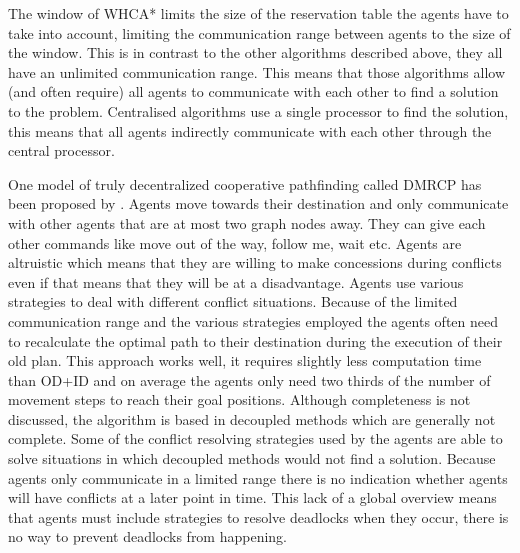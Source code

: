 The window of WHCA* limits the size of the reservation table the agents have to
take into account, limiting the communication range between agents to the size
of the window. This is in contrast to the other algorithms described above,
they all have an unlimited communication range. This means that those
algorithms allow (and often require) all agents to communicate with each other
to find a solution to the problem. Centralised algorithms use a single
processor to find the solution, this means that all agents indirectly
communicate with each other through the central processor.

One model of truly decentralized cooperative pathfinding called DMRCP has been
proposed by \cite{wei2016}. Agents move towards their destination and only
communicate with other agents that are at most two graph nodes away. They can
give each other commands like
move out of the way, follow me, wait etc. Agents are altruistic which means
that they are willing to make concessions during conflicts even if that means
that they will be at a disadvantage. Agents use various strategies to deal with
different conflict situations. Because of the limited communication range and
the various strategies employed the agents often need to recalculate the
optimal path to their destination during the execution of their old plan. This
approach works well, it requires slightly less computation time than OD+ID and
on average the agents only need two thirds of the number of movement steps to
reach their goal positions. Although completeness is not discussed, the
algorithm is based in decoupled methods which are generally not complete. Some
of the conflict resolving strategies used by the agents are able to solve
situations in which decoupled methods would not find a solution.
Because agents only communicate in a limited range there is no indication
whether agents will have conflicts at a later point in time. This lack of a
global overview means that agents must include strategies to resolve deadlocks
when they occur, there is no way to prevent deadlocks from happening.

